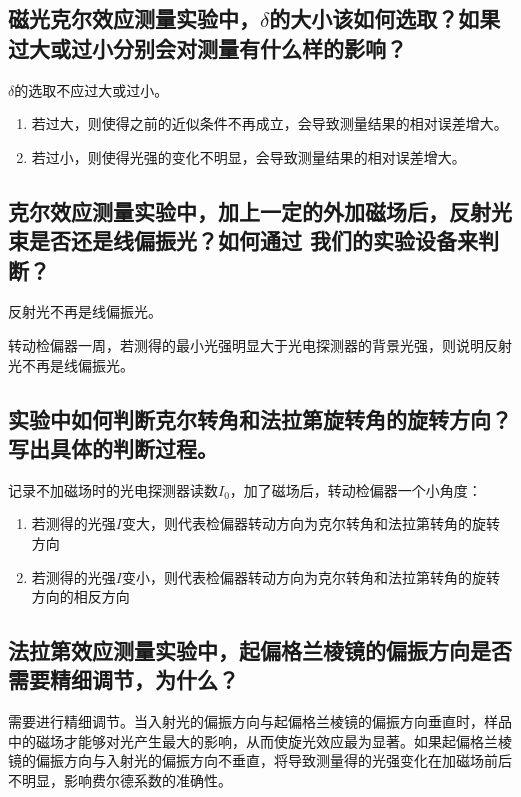 \documentclass[a4paper,UTF8]{ctexart}
\begin{document}
\subsection{磁光克尔效应测量实验中，$\delta$的大小该如何选取？如果过大或过小分别会对测量有什么样的影响？}

$\delta$的选取不应过大或过小。

\begin{enumerate}
    \item 若过大，则使得之前的近似条件不再成立，会导致测量结果的相对误差增大。
    \item 若过小，则使得光强的变化不明显，会导致测量结果的相对误差增大。
\end{enumerate}

\subsection{克尔效应测量实验中，加上一定的外加磁场后，反射光束是否还是线偏振光？如何通过
我们的实验设备来判断？}

反射光不再是线偏振光。

转动检偏器一周，若测得的最小光强明显大于光电探测器的背景光强，则说明反射光不再是线偏振光。

\subsection{实验中如何判断克尔转角和法拉第旋转角的旋转方向？写出具体的判断过程。}

记录不加磁场时的光电探测器读数$I_0$，加了磁场后，转动检偏器一个小角度：

\begin{enumerate}
    \item 若测得的光强$I$变大，则代表检偏器转动方向为克尔转角和法拉第转角的旋转方向
    \item 若测得的光强$I$变小，则代表检偏器转动方向为克尔转角和法拉第转角的旋转方向的相反方向
\end{enumerate}

\subsection{法拉第效应测量实验中，起偏格兰棱镜的偏振方向是否需要精细调节，为什么？}

需要进行精细调节。当入射光的偏振方向与起偏格兰棱镜的偏振方向垂直时，样品中的磁场才能够对光产生最大的影响，从而使旋光效应最为显著。如果起偏格兰棱镜的偏振方向与入射光的偏振方向不垂直，将导致测量得的光强变化在加磁场前后不明显，影响费尔德系数的准确性。
\end{document}

